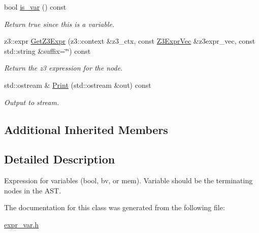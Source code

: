 \begin{DoxyCompactItemize}
\mbox{\label{classilang_1_1_expr_var_afae87ee1c5410ec0d68ecbc918de3b2f}} 
bool \mbox{\hyperlink{classilang_1_1_expr_var_afae87ee1c5410ec0d68ecbc918de3b2f}{is\+\_\+var}} () const
\begin{DoxyCompactList}\small\item\em Return true since this is a variable. \end{DoxyCompactList}\item 
\mbox{\label{classilang_1_1_expr_var_a4d8aefd58cf64ecda9b08c0108e90956}} 
z3\+::expr \mbox{\hyperlink{classilang_1_1_expr_var_a4d8aefd58cf64ecda9b08c0108e90956}{Get\+Z3\+Expr}} (z3\+::context \&z3\+\_\+ctx, const \mbox{\hyperlink{namespaceilang_adc4eee919aa24fff882d03a48d733c19}{Z3\+Expr\+Vec}} \&z3expr\+\_\+vec, const std\+::string \&suffix=\char`\"{}\char`\"{}) const
\begin{DoxyCompactList}\small\item\em Return the z3 expression for the node. \end{DoxyCompactList}\item 
\mbox{\label{classilang_1_1_expr_var_a037a255c25eb048b6f55cc459379b57b}} 
std\+::ostream \& \mbox{\hyperlink{classilang_1_1_expr_var_a037a255c25eb048b6f55cc459379b57b}{Print}} (std\+::ostream \&out) const
\begin{DoxyCompactList}\small\item\em Output to stream. \end{DoxyCompactList}\end{DoxyCompactItemize}
\subsection*{Additional Inherited Members}


\subsection{Detailed Description}
Expression for variables (bool, bv, or mem). Variable should be the terminating nodes in the A\+ST. 

The documentation for this class was generated from the following file\+:\begin{DoxyCompactItemize}
\item 
\mbox{\hyperlink{expr__var_8h}{expr\+\_\+var.\+h}}\end{DoxyCompactItemize}
